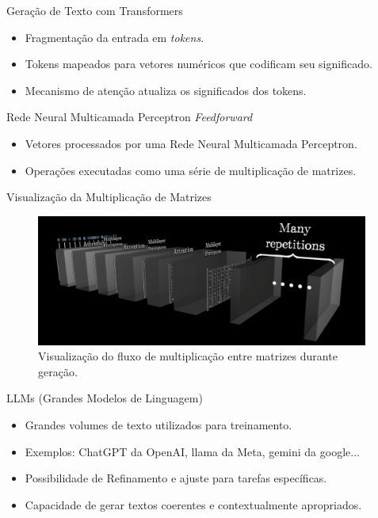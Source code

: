 \documentclass{beamer}
\begin{document}
\begin{frame}{Geração de Texto com Transformers}
    \begin{itemize}
        \item Fragmentação da entrada em \textit{tokens}. 
        \item Tokens mapeados para vetores numéricos que codificam seu significado.
        \item Mecanismo de atenção atualiza os significados dos tokens.
    \end{itemize}
\end{frame}

\begin{frame}{Rede Neural Multicamada Perceptron \textit{Feedforward}}
    \begin{itemize}
        \item Vetores processados por uma Rede Neural Multicamada Perceptron.
        \item Operações executadas como uma série de multiplicação de matrizes.
    \end{itemize}
\end{frame}

\begin{frame}[allowframebreaks]{Visualização da Multiplicação de Matrizes}
    \begin{figure}[!h]
        \centering
        \includegraphics[width=4.3in]{images/Transformer inference in tokens flow.png}
        \caption{Visualização do fluxo de multiplicação entre matrizes durante geração.}
        \label{fig:VisualizacaoMatrizes.}
    \end{figure}
\end{frame}

\begin{frame}[allowframebreaks]{LLMs (Grandes Modelos de Linguagem)}
  \begin{itemize}
    \item Grandes volumes de texto utilizados para treinamento.
    \item Exemplos: ChatGPT da OpenAI, llama da Meta, gemini da google...
    \item Possibilidade de Refinamento e ajuste para tarefas específicas.
    \item Capacidade de gerar textos coerentes e contextualmente apropriados.
  \end{itemize}
\end{frame}
\end{document}

